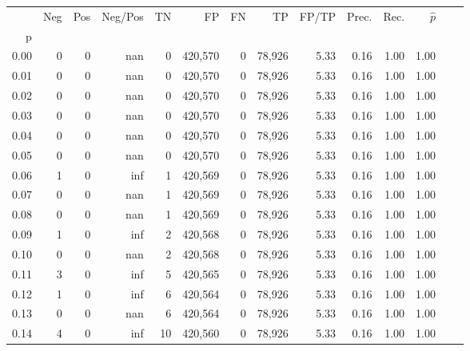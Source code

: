 \begin{tabular}{rrrrrrrrrrrrrr}
\toprule
{} &     Neg &    Pos & Neg/Pos &       TN &       FP &      FN &      TP & FP/TP & Prec. &  Rec. & $\hat{p}$ \\
p    &         &        &         &          &          &         &         &       &       &       &           \\
\midrule
0.00 &       0 &      0 &     nan &        0 &  420,570 &       0 &  78,926 &  5.33 &  0.16 &  1.00 &      1.00 \\
0.01 &       0 &      0 &     nan &        0 &  420,570 &       0 &  78,926 &  5.33 &  0.16 &  1.00 &      1.00 \\
0.02 &       0 &      0 &     nan &        0 &  420,570 &       0 &  78,926 &  5.33 &  0.16 &  1.00 &      1.00 \\
0.03 &       0 &      0 &     nan &        0 &  420,570 &       0 &  78,926 &  5.33 &  0.16 &  1.00 &      1.00 \\
0.04 &       0 &      0 &     nan &        0 &  420,570 &       0 &  78,926 &  5.33 &  0.16 &  1.00 &      1.00 \\
0.05 &       0 &      0 &     nan &        0 &  420,570 &       0 &  78,926 &  5.33 &  0.16 &  1.00 &      1.00 \\
0.06 &       1 &      0 &     inf &        1 &  420,569 &       0 &  78,926 &  5.33 &  0.16 &  1.00 &      1.00 \\
0.07 &       0 &      0 &     nan &        1 &  420,569 &       0 &  78,926 &  5.33 &  0.16 &  1.00 &      1.00 \\
0.08 &       0 &      0 &     nan &        1 &  420,569 &       0 &  78,926 &  5.33 &  0.16 &  1.00 &      1.00 \\
0.09 &       1 &      0 &     inf &        2 &  420,568 &       0 &  78,926 &  5.33 &  0.16 &  1.00 &      1.00 \\
0.10 &       0 &      0 &     nan &        2 &  420,568 &       0 &  78,926 &  5.33 &  0.16 &  1.00 &      1.00 \\
0.11 &       3 &      0 &     inf &        5 &  420,565 &       0 &  78,926 &  5.33 &  0.16 &  1.00 &      1.00 \\
0.12 &       1 &      0 &     inf &        6 &  420,564 &       0 &  78,926 &  5.33 &  0.16 &  1.00 &      1.00 \\
0.13 &       0 &      0 &     nan &        6 &  420,564 &       0 &  78,926 &  5.33 &  0.16 &  1.00 &      1.00 \\
0.14 &       4 &      0 &     inf &       10 &  420,560 &       0 &  78,926 &  5.33 &  0.16 &  1.00 &      1.00 \\

\end{tabular}

